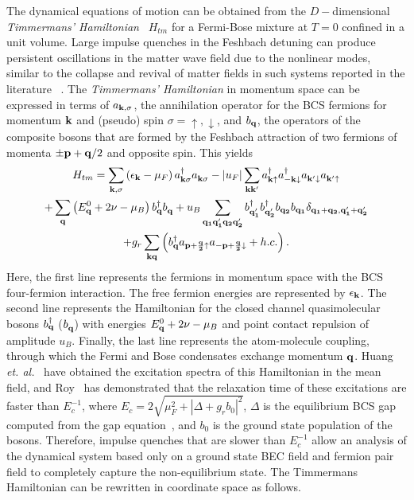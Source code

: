 \documentclass[aps,pra,floats,epsfig,pdflatex]{revtex4}                                                              %
\begin{document}
 {The dynamical equations of motion can be obtained from the $D-$dimensional \textit{Timmermans' Hamiltonian}}~\cite{timmermans}  {$H_{tm}$ for a Fermi-Bose mixture at $T=0$ confined in a unit volume. Large impulse quenches in the Feshbach detuning can produce persistent oscillations in the matter wave field due to the nonlinear modes, similar to the collapse and revival of matter fields in such systems reported in the literature}~\cite{colrev,huang:becbcs1} {. The \textit{Timmermans' Hamiltonian} in momentum space can be expressed in terms of $a_{{\bf k},\sigma}$, the annihilation operator for the BCS fermions for momentum ${\bf k}$  and (pseudo) spin $\sigma = \uparrow,\downarrow$, and $b_{\bf q}$, the operators of the composite bosons that are formed by the Feshbach attraction of two fermions of momenta $\pm {\bf p}+{\bf q}/2$ and opposite spin.}  {This yields}~\cite{mypaper4}
\begin{multline}
\label{eq:timmermans:kspace}
H_{tm} = \sum_{{\bf k},\sigma} \left(\epsilon_{\bf k} - \mu_F \right)a^\dagger_{{\bf k}\sigma}a^{ }_{{\bf k}\sigma} - |u_F|\sum_{{\bf k}{\bf k'}}a^\dagger_{{\bf k}\uparrow}a^\dagger_{-{\bf k}\downarrow}a^{ }_{{\bf k'}\downarrow}a^{ }_{{\bf k'}\uparrow}\\
+\sum_{\bf q} \left(E^0_{\bf q}+2\nu-\mu_B \right)b^\dagger_{\bf q}b^{ }_{\bf q} + u_B\sum_{{\bf q_1}{\bf q'_1} {\bf q_2} {\bf q'_2}}b^\dagger_{\bf q'_1}b^\dagger_{\bf q'_2} b_{\bf q_2} b_{\bf q_1}\delta_{{\bf q_1}+{\bf q_2},{\bf q'_1}+{\bf q'_2}}\\
+g_r\sum_{{\bf k}{\bf q}}\left(b^\dagger_{\bf q}a_{{\bf p+\frac{q}{2}}\uparrow}a_{{\bf -p+\frac{q}{2}}\downarrow} + h.c. \right).
\end{multline}
 {Here, the first line represents the fermions in momentum space with the BCS four-fermion interaction. The free fermion energies are represented by $\epsilon_{\bf k}$. The second line represents the Hamiltonian for the closed channel quasimolecular bosons $b^\dagger_{\bf q}$ ($b^{ }_{\bf q}$) with energies $E^0_{\bf q}+2\nu-\mu_B$ and point contact repulsion of amplitude $u_B$. Finally, the last line represents the atom-molecule coupling, through which the Fermi and Bose condensates exchange momentum ${\bf q}$. Huang \textit{et. al.}}~\cite{huang:becbcs2}  {have obtained the excitation spectra of this Hamiltonian in the mean field}, and Roy~\cite{mypaper4} has demonstrated that the relaxation time of these excitations are faster than $E^{-1}_c$, where $E_c = 2\sqrt{\mu^2_F + |\Delta + g_rb_0|^2}$, $\Delta$ is the equilibrium BCS gap computed from the gap equation~\cite{coleman}, and $b_0$ is the ground state population of the bosons. Therefore, impulse quenches that are slower than $E^{-1}_c$ allow an 
analysis of the dynamical system based only on a ground state BEC field and fermion pair field to completely capture the non-equilibrium state. The Timmermans Hamiltonian can be rewritten in coordinate space as follows.
\end{document}

